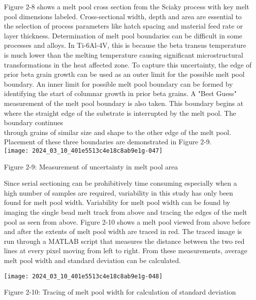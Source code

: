 \documentclass[10pt]{article}
\begin{document}
Figure 2-8 shows a melt pool cross section from the Sciaky process with key melt pool dimensions labeled. Cross-sectional width, depth and area are essential to the selection of process parameters like hatch spacing and material feed rate or layer thickness. Determination of melt pool boundaries can be difficult in some processes and alloys. In Ti-6Al-4V, this is because the beta transus temperature is much lower than the melting temperature causing significant microstructural transformations in the heat affected zone. To capture this uncertainty, the edge of prior beta grain growth can be used as an outer limit for the possible melt pool boundary. An inner limit for possible melt pool boundary can be formed by identifying the start of columnar growth in prior beta grains. A "Best Guess" measurement of the melt pool boundary is also taken. This boundary begins at where the straight edge of the substrate is interrupted by the melt pool. The boundary continues\\
through grains of similar size and shape to the other edge of the melt pool. Placement of these three boundaries are demonstrated in Figure 2-9.\\
\texttt{[image: 2024\_03\_10\_401e5513c4e18c8ab9e1g-047]}

Figure 2-9: Measurement of uncertainty in melt pool area

Since serial sectioning can be prohibitively time consuming especially when a high number of samples are required, variability in this study has only been found for melt pool width. Variability for melt pool width can be found by imaging the single bead melt track from above and tracing the edges of the melt pool as seen from above. Figure 2-10 shows a melt pool viewed from above before and after the extents of melt pool width are traced in red. The traced image is run through a MATLAB script that measures the distance between the two red lines at every pixel moving from left to right. From these measurements, average melt pool width and standard deviation can be calculated.

\begin{center}
\texttt{[image: 2024\_03\_10\_401e5513c4e18c8ab9e1g-048]}
\end{center}

Figure 2-10: Tracing of melt pool width for calculation of standard deviation
\end{document}
